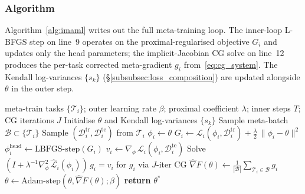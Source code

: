 \documentclass[10pt,journal,compsoc]{IEEEtran}
\begin{document}
\subsubsection{Algorithm}\label{subsubsec:algorithm}

Algorithm~\ref{alg:imaml} writes out the full meta-training loop. The
inner-loop L-BFGS step on line~9 operates on the proximal-regularised
objective $G_i$ and updates only the head parameters; the implicit-Jacobian
CG solve on line~12 produces the per-task corrected meta-gradient
$g_i$ from~\eqref{eq:cg_system}. The Kendall log-variances $\{s_k\}$
(\S\ref{subsubsec:loss_composition}) are updated alongside $\theta$ in
the outer step.

\begin{algorithm}[!t]
\renewcommand{\algorithmicrequire}{\textbf{Require:}}
\renewcommand{\algorithmicensure}{\textbf{Output:}}
\begin{algorithmic}[1]
\REQUIRE meta-train tasks $\{\mathcal{T}_i\}$; outer learning rate $\beta$;
         proximal coefficient $\lambda$; inner steps $T$; CG iterations $J$
\STATE Initialise $\theta$ and Kendall log-variances $\{s_k\}$
  \STATE Sample meta-batch $\mathcal{B} \subset \{\mathcal{T}_i\}$
    \STATE Sample $(\mathcal{D}_i^{\text{tr}}, \mathcal{D}_i^{\text{te}})$ from $\mathcal{T}_i$
    \STATE $\phi_i \leftarrow \theta$
	\STATE $G_i \leftarrow \mathcal{L}_i(\phi_i, \mathcal{D}_i^{\text{tr}}) + \frac{\lambda}{2}\,\|\phi_i - \theta\|^2$
      \STATE $\phi_i^{\text{head}} \leftarrow \text{LBFGS-step}(G_i)$
    \ENDFOR
    \STATE $v_i \leftarrow \nabla_\phi\,\mathcal{L}_i(\phi_i, \mathcal{D}_i^{\text{te}})$
    \STATE Solve $(I + \lambda^{-1} \nabla^2_\phi\,\hat{\mathcal{L}}_i(\phi_i))\,g_i = v_i$
           for $g_i$ via $J$-iter CG
  \ENDFOR
  \STATE $\hat{\nabla} F(\theta) \leftarrow \frac{1}{|\mathcal{B}|} \sum_{\mathcal{T}_i \in \mathcal{B}} g_i$
  \STATE $\theta \leftarrow \text{Adam-step}(\theta, \hat{\nabla} F(\theta); \beta)$
\ENDWHILE
\STATE \textbf{return} $\theta^*$
\end{algorithmic}
\caption{iMAML meta-training with ANIL inner adaptation. After
Rajeswaran et al.~\cite{rajeswaran2019}; ANIL split per
Raghu et al.~\cite{raghu2020}.}
\label{alg:imaml}
\end{algorithm}
\end{document}
